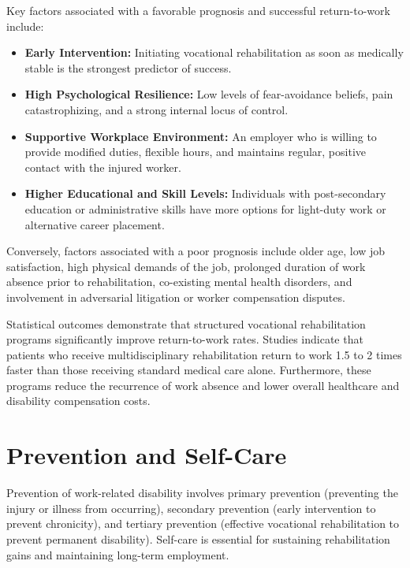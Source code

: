 Key factors associated with a favorable prognosis and successful return-to-work include:
\begin{itemize}
    \item \textbf{Early Intervention:} Initiating vocational rehabilitation as soon as medically stable is the strongest predictor of success.
    \item \textbf{High Psychological Resilience:} Low levels of fear-avoidance beliefs, pain catastrophizing, and a strong internal locus of control.
    \item \textbf{Supportive Workplace Environment:} An employer who is willing to provide modified duties, flexible hours, and maintains regular, positive contact with the injured worker.
    \item \textbf{Higher Educational and Skill Levels:} Individuals with post-secondary education or administrative skills have more options for light-duty work or alternative career placement.
\end{itemize}

Conversely, factors associated with a poor prognosis include older age, low job satisfaction, high physical demands of the job, prolonged duration of work absence prior to rehabilitation, co-existing mental health disorders, and involvement in adversarial litigation or worker compensation disputes.

Statistical outcomes demonstrate that structured vocational rehabilitation programs significantly improve return-to-work rates. Studies indicate that patients who receive multidisciplinary rehabilitation return to work 1.5 to 2 times faster than those receiving standard medical care alone. Furthermore, these programs reduce the recurrence of work absence and lower overall healthcare and disability compensation costs.

\section*{Prevention and Self-Care}
Prevention of work-related disability involves primary prevention (preventing the injury or illness from occurring), secondary prevention (early intervention to prevent chronicity), and tertiary prevention (effective vocational rehabilitation to prevent permanent disability). Self-care is essential for sustaining rehabilitation gains and maintaining long-term employment.

